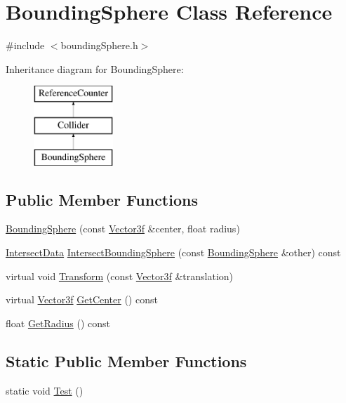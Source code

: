 \hypertarget{class_bounding_sphere}{}\section{Bounding\+Sphere Class Reference}
\label{class_bounding_sphere}


{\ttfamily \#include $<$bounding\+Sphere.\+h$>$}

Inheritance diagram for Bounding\+Sphere\+:\begin{figure}[H]
\begin{center}
\leavevmode
\includegraphics[height=3.000000cm]{class_bounding_sphere}
\end{center}
\end{figure}
\subsection*{Public Member Functions}
\begin{DoxyCompactItemize}
\item 
\hyperlink{class_bounding_sphere_a6139e246a2611b6479073746dbb35cbd}{Bounding\+Sphere} (const \hyperlink{class_vector3f}{Vector3f} \&center, float radius)
\item 
\hyperlink{class_intersect_data}{Intersect\+Data} \hyperlink{class_bounding_sphere_a9356041ca570b82ee9e99d70a60e57d1}{Intersect\+Bounding\+Sphere} (const \hyperlink{class_bounding_sphere}{Bounding\+Sphere} \&other) const 
\item 
virtual void \hyperlink{class_bounding_sphere_a272125f529f43fb07ef026afb115ce56}{Transform} (const \hyperlink{class_vector3f}{Vector3f} \&translation)
\item 
virtual \hyperlink{class_vector3f}{Vector3f} \hyperlink{class_bounding_sphere_aa060fdf09876145ec3cebe80c769eceb}{Get\+Center} () const 
\item 
float \hyperlink{class_bounding_sphere_a40d9116ac275d1528b9477620a17d0d0}{Get\+Radius} () const 
\end{DoxyCompactItemize}
\subsection*{Static Public Member Functions}
\begin{DoxyCompactItemize}
\item 
static void \hyperlink{class_bounding_sphere_a73e8a4e978f583ace1bebcab3e32d5c2}{Test} ()
\end{DoxyCompactItemize}
